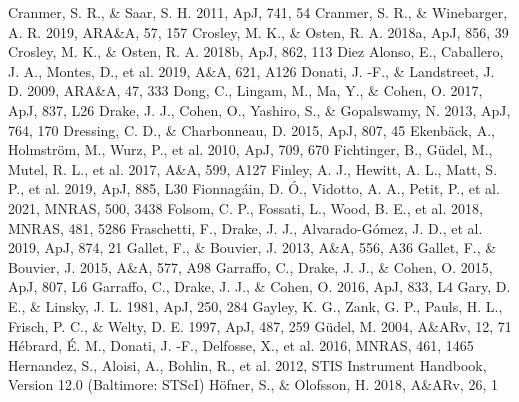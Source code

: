 \documentclass[preprint]{aastex}
\begin{document}
\begin{thebibliography}{}
Cranmer, S. R., \& Saar, S. H. 2011, ApJ, 741, 54
Cranmer, S. R., \& Winebarger, A. R. 2019, ARA\&A, 57, 157
Crosley, M. K., \& Osten, R. A. 2018a, ApJ, 856, 39
Crosley, M. K., \& Osten, R. A. 2018b, ApJ, 862, 113
Diez Alonso, E., Caballero, J. A., Montes, D., et al. 2019, A\&A, 621, A126
Donati, J. -F., \& Landstreet, J. D. 2009, ARA\&A, 47, 333
Dong, C., Lingam, M., Ma, Y., \& Cohen, O. 2017, ApJ, 837, L26
Drake, J. J., Cohen, O., Yashiro, S., \& Gopalswamy, N. 2013, ApJ, 764, 170
Dressing, C. D., \& Charbonneau, D. 2015, ApJ, 807, 45
Ekenb\"{a}ck, A., Holmstr\"{o}m, M., Wurz, P., et al. 2010, ApJ, 709, 670
Fichtinger, B., G\"{u}del, M., Mutel, R. L., et al. 2017, A\&A, 599, A127
Finley, A. J., Hewitt, A. L., Matt, S. P., et al. 2019, ApJ, 885, L30
Fionnag\'{a}in, D. \'{O}., Vidotto, A. A., Petit, P., et al. 2021,
  MNRAS, 500, 3438
Folsom, C. P., Fossati, L., Wood, B. E., et al. 2018, MNRAS, 481, 5286
Fraschetti, F., Drake, J. J., Alvarado-G\'{o}mez, J. D., et al. 2019,
  ApJ, 874, 21
Gallet, F., \& Bouvier, J. 2013, A\&A, 556, A36
Gallet, F., \& Bouvier, J. 2015, A\&A, 577, A98
Garraffo, C., Drake, J. J., \& Cohen, O. 2015, ApJ, 807, L6
Garraffo, C., Drake, J. J., \& Cohen, O. 2016, ApJ, 833, L4
Gary, D. E., \& Linsky, J. L. 1981, ApJ, 250, 284
Gayley, K. G., Zank, G. P., Pauls, H. L., Frisch, P. C., \& Welty, D. E.
  1997, ApJ, 487, 259
G\"{u}del, M. 2004, A\&ARv, 12, 71
H\'{e}brard, \'{E}. M., Donati, J. -F., Delfosse, X., et al. 2016,
  MNRAS, 461, 1465
Hernandez, S., Aloisi, A., Bohlin, R., et al. 2012, STIS Instrument
  Handbook, Version 12.0 (Baltimore: STScI)
H\"{o}fner, S., \& Olofsson, H. 2018, A\&ARv, 26, 1

\end{thebibliography}
\end{document}
